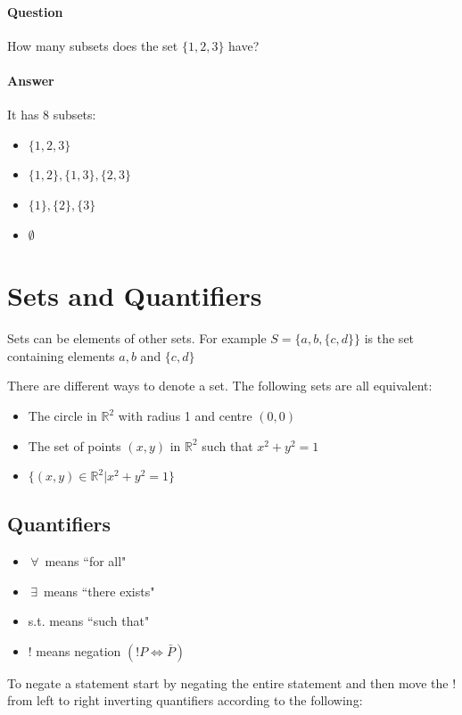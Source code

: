 \documentclass{article}
\newcommand{\bb}[1]{\mathbb{#1}}
\newcommand{\A}{\,\forall\,}
\newcommand{\E}{\,\exists\,}
\newcounter{example}[section]
\begin{document}
\paragraph{Question} How many subsets does the set \(\{1,2,3\}\) have?

\paragraph{Answer}  It has 8 subsets:
\begin{itemize}
\item \(\{1,2,3\}\)
\item \(\{1,2\},\{1,3\},\{2,3\}\)
\item \(\{1\},\{2\},\{3\}\)
\item \(\emptyset\)
\end{itemize}

\section{Sets and Quantifiers}

Sets can be elements of other sets. For example \(S=\{a,b,\{c,d\}\}\) is the set containing elements \(a,b\) and \(\{c,d\}\)

There are different ways to denote a set. The following sets are all equivalent:

\begin{itemize}
\item The circle in \(\bb R^2\) with radius 1 and centre \((0,0)\)
\item The set of points \((x,y)\) in \(\bb R^2\) such that \(x^2+y^2=1\)
\item \(\{(x,y)\in\bb R^2|x^2+y^2=1\}\)
\end{itemize}

\subsection*{Quantifiers}

\begin{itemize}
\item \(\A\) means ``for all"
\item \(\E\) means ``there exists"
\item s.t. means ``such that"
\item \(!\) means negation \((!P\iff\bar P)\)
\end{itemize}

To negate a statement start by negating the entire statement and then move the \(!\) from left to right inverting quantifiers according to the following:
\end{document}
